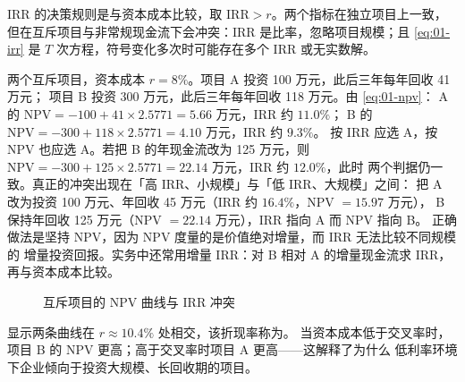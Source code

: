 IRR 的决策规则是与资本成本比较，取 $\mathrm{IRR} > r$。两个指标在独立项目上一致，
但在互斥项目与非常规现金流下会冲突：IRR 是比率，忽略项目规模；且 \cref{eq:01-irr} 是
$T$ 次方程，符号变化多次时可能存在多个 IRR 或无实数解。

\begin{example}\label{ex:01-npv}
两个互斥项目，资本成本 $r = 8\%$。项目 A 投资 100 万元，此后三年每年回收 41 万元；
项目 B 投资 300 万元，此后三年每年回收 118 万元。由 \cref{eq:01-npv}：
A 的 $\mathrm{NPV} = -100 + 41 \times 2.5771 = 5.66$ 万元，IRR 约 $11.0\%$；
B 的 $\mathrm{NPV} = -300 + 118 \times 2.5771 = 4.10$ 万元，IRR 约 $9.3\%$。
按 IRR 应选 A，按 NPV 也应选 A。若把 B 的年现金流改为 125 万元，则
$\mathrm{NPV} = -300 + 125 \times 2.5771 = 22.14$ 万元，IRR 约 $12.0\%$，此时
两个判据仍一致。真正的冲突出现在「高 IRR、小规模」与「低 IRR、大规模」之间：
把 A 改为投资 100 万元、年回收 45 万元（IRR 约 $16.4\%$，NPV $= 15.97$ 万元），
B 保持年回收 125 万元（NPV $= 22.14$ 万元），IRR 指向 A 而 NPV 指向 B。
正确做法是坚持 NPV，因为 NPV 度量的是价值绝对增量，而 IRR 无法比较不同规模的
增量投资回报。实务中还常用增量 IRR：对 B 相对 A 的增量现金流求 IRR，再与资本成本比较。
\end{example}

\begin{figure}[htbp]
\centering
{}
\caption{互斥项目的 NPV 曲线与 IRR 冲突}\label{fig:01-npv}
\end{figure}

 显示两条曲线在 $r \approx 10.4\%$ 处相交，该折现率称为。
当资本成本低于交叉率时，项目 B 的 NPV 更高；高于交叉率时项目 A 更高——这解释了为什么
低利率环境下企业倾向于投资大规模、长回收期的项目。

